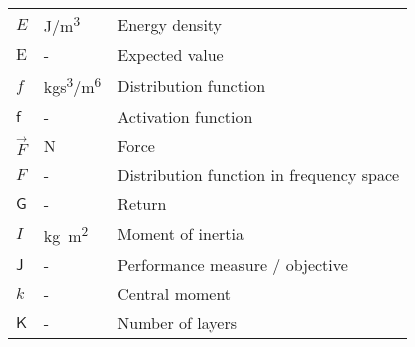 \begin{longtable}{p{5cm}p{4cm}p{5cm}}
    $E$                     & \si{J/m\cubed}  & Energy density \\
    $\mathrm{E}$			& \si{-}		& Expected value \\
    $f$						& \si{kgs\cubed/m\tothe{6}} & Distribution function \\
    $\mathsf{f}$			& \si{-}		& Activation function \\
    $\vec{F}$				& \si{N}		& Force \\
    $F$						& \si{-}		& Distribution function in frequency space \\
    $\mathsf{G}$			& \si{-}		& Return \\
    $I$						& \si{kg m\squared} & Moment of inertia \\
    $\mathsf{J}$			& \si{-}		& Performance measure / objective \\
    $k$						& \si{-}		& Central moment \\
    $\mathsf{K}$			& \si{-}		& Number of layers \\

\end{longtable}
